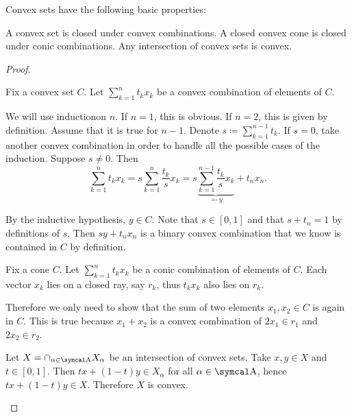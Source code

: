 \begin{proposition}\label{thm:convex_set_properties}
  Convex sets have the following basic properties:

  \begin{thmenum}
     A convex set is closed under convex combinations.
     A closed convex cone is closed under conic combinations.
     Any intersection of convex sets is convex.
  \end{thmenum}
\end{proposition}
\begin{proof}
  \begin{description}
     Fix a convex set \( C \). Let \( \sum_{k=1}^n t_k x_k \) be a convex combination of elements of \( C \).

    We will use induction\IND on \( n \). If \( n = 1 \), this is obvious. If \( n = 2 \), this is given by definition. Assume that it is true for \( n - 1 \). Denote \( s \coloneqq \sum_{k=1}^{n-1} t_k \). If \( s = 0 \), take another convex combination in order to handle all the possible cases of the induction. Suppose \( s \neq 0 \). Then
    \begin{equation*}
      \sum_{k=1}^n t_k x_k
      =
      s \sum_{k=1}^n \frac {t_k} s x_k
      =
      s \underbrace{\sum_{k=1}^{n-1} \frac {t_k} s x_k}_{\eqqcolon y} + t_n x_n.
    \end{equation*}

    By the inductive hypothesis, \( y \in C \). Note that \( s \in [0, 1] \) and that \( s + t_n = 1 \) by definitions of \( s \). Then \( s y + t_n x_n \) is a binary convex combination that we know is contained in \( C \) by definition.

     Fix a cone \( C \). Let \( \sum_{k=1}^n t_k x_k \) be a conic combination of elements of \( C \). Each vector \( x_k \) lies on a closed ray, say \( r_k \), thus \( t_k x_k \) also lies on \( r_k \).

    Therefore we only need to show that the sum of two elements \( x_1, x_2 \in C \) is again in \( C \). This is true because \( x_1 + x_2 \) is a convex combination of \( 2x_1 \in r_1 \) and \( 2x_2 \in r_2 \).

     Let \( X = \cap_{\alpha \in \A} X_\alpha \) be an intersection of convex sets. Take \( x, y \in X \) and \( t \in [0, 1] \). Then \( tx + (1-t)y \in X_\alpha \) for all \( \alpha \in \A \), hence \( tx + (1-t)y \in X \). Therefore \( X \) is convex.
  \end{description}
\end{proof}


